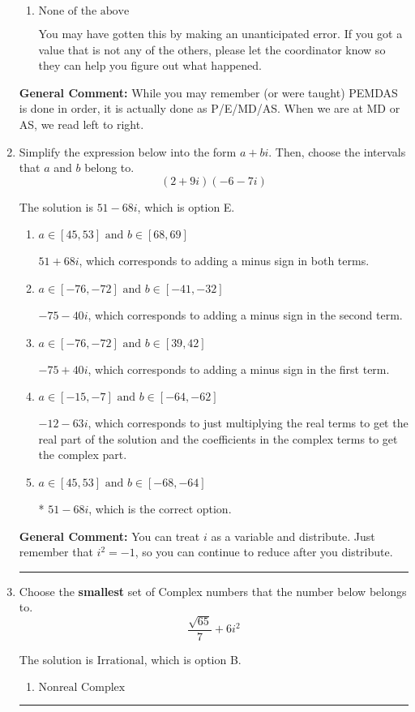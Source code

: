 \documentclass{extbook}[14pt]
\newcommand{\litem}[1]{\item #1

\rule{\textwidth}{0.4pt}}
\begin{document}
\begin{enumerate}
{\begin{enumerate}[label=\Alph*.]
 -319.295, which corresponds to an Order of Operations error: not reading left-to-right for multiplication/division.
\item \( \text{None of the above} \)

 You may have gotten this by making an unanticipated error. If you got a value that is not any of the others, please let the coordinator know so they can help you figure out what happened.
\end{enumerate}

\textbf{General Comment:} While you may remember (or were taught) PEMDAS is done in order, it is actually done as P/E/MD/AS. When we are at MD or AS, we read left to right.
}
\litem{
Simplify the expression below into the form $a+bi$. Then, choose the intervals that $a$ and $b$ belong to.
\[ (2 + 9 i)(-6 - 7 i) \]

The solution is \( 51 - 68 i \), which is option E.\begin{enumerate}[label=\Alph*.]
\item \( a \in [45, 53] \text{ and } b \in [68, 69] \)

 $51 + 68 i$, which corresponds to adding a minus sign in both terms.
\item \( a \in [-76, -72] \text{ and } b \in [-41, -32] \)

 $-75 - 40 i$, which corresponds to adding a minus sign in the second term.
\item \( a \in [-76, -72] \text{ and } b \in [39, 42] \)

 $-75 + 40 i$, which corresponds to adding a minus sign in the first term.
\item \( a \in [-15, -7] \text{ and } b \in [-64, -62] \)

 $-12 - 63 i$, which corresponds to just multiplying the real terms to get the real part of the solution and the coefficients in the complex terms to get the complex part.
\item \( a \in [45, 53] \text{ and } b \in [-68, -64] \)

* $51 - 68 i$, which is the correct option.
\end{enumerate}

\textbf{General Comment:} You can treat $i$ as a variable and distribute. Just remember that $i^2=-1$, so you can continue to reduce after you distribute.
}
\litem{
Choose the \textbf{smallest} set of Complex numbers that the number below belongs to.
\[ \frac{\sqrt{65}}{7}+6i^2 \]

The solution is \( \text{Irrational} \), which is option B.\begin{enumerate}[label=\Alph*.]
\item \( \text{Nonreal Complex} \)


\end{enumerate}}
\end{enumerate}
\end{document}
